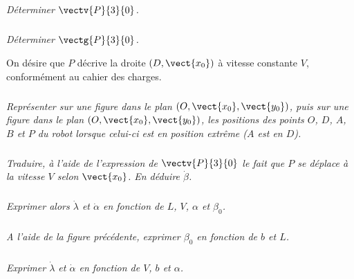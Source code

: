 \begin{multicols}{2}
\subparagraph{}
\textit{Déterminer $\vectv{P}{3}{0}$.}


\subparagraph{}
\textit{Déterminer $\vectg{P}{3}{0}$.}


On désire que $P$ décrive la droite $(D,\vect{x_0})$ à vitesse constante $V$, conformément au cahier des charges. 

\subparagraph{}
\textit{Représenter sur une figure dans le plan $(O,\vect{x_0},\vect{y_0})$, puis sur une figure dans le plan $(O,\vect{x_0},\vect{y_0})$, les positions des points $O$, $D$, $A$, $B$ et $P$ du robot lorsque celui-ci est en position extrême ($A$ est en $D$).}


\subparagraph{}
\textit{Traduire, à l'aide de l'expression de $\vectv{P}{3}{0}$ le fait que $P$ se déplace à la vitesse $V$ selon $\vect{x_0}$. En déduire $\dot{\beta}$.}

\subparagraph{}
\textit{Exprimer alors $\dot{\lambda}$ et $\dot{\alpha}$ en fonction de $L$, $V$, $\alpha$ et $\beta_0$. }

\subparagraph{}
\textit{A l'aide de la figure précédente, exprimer $\beta_0$ en fonction de $b$ et $L$.}

\subparagraph{}
\textit{Exprimer $\dot{\lambda}$ et $\dot{\alpha}$ en fonction de $V$, $b$ et $\alpha$.}

\ifprof
\else
\end{multicols}
\fi


